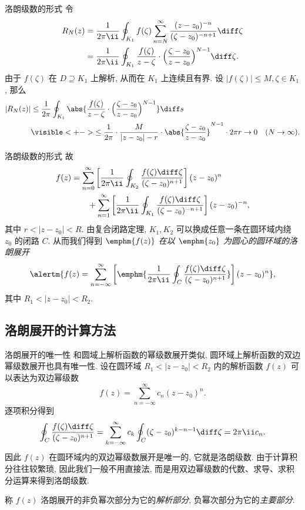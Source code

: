 \begin{frame}{洛朗级数的形式}
	\onslide<+->
	令
	\begin{align*}
		R_N(z)&=\frac1{2\pi\ii}\oint_{K_1}f(\zeta)\sum_{n=N}^\infty\frac{(z-z_0)^{-n}}{(\zeta-z_0)^{-n+1}}\diff\zeta\\
		&=\frac1{2\pi\ii}\oint_{K_1}\frac{f(\zeta)}{z-\zeta}\cdot\Bigl(\frac{\zeta-z_0}{z-z_0}\Bigr)^{N-1}\diff\zeta.
	\end{align*}
	\onslide<+->
	由于 $f(\zeta)$ 在 $D\supseteq K_1$ 上解析, 从而在 $K_1$ 上连续且有界.
	\onslide<+->
	设 $|f(\zeta)|\le M,\zeta\in K_1$,
	\onslide<+->
	那么
	\begin{align*}
	|R_N(z)|&\le\frac 1{2\pi}\oint_{K_1}\abs{\frac{f(\zeta)}{z-\zeta}\cdot\Bigl(\frac{\zeta-z_0}{z-z_0}\Bigr)^{N-1}}\diff s\\
	&\visible<+->{\le\frac 1{2\pi}\cdot\frac M{|z-z_0|-r}\cdot\abs{\frac{\zeta-z_0}{z-z_0}}^{N-1}\cdot 2\pi r\to 0\quad (N\to\infty).}
	\end{align*}
\end{frame}


\begin{frame}{洛朗级数的形式}
	\onslide<+->
	故
	\begin{align*}
	f(z)&=\sum_{n=0}^\infty\left[\frac1{2\pi\ii}\oint_{K_2}\frac{f(\zeta)\diff\zeta}{(\zeta-z_0)^{n+1}}\right](z-z_0)^n\\
	&\qquad+\sum_{n=1}^\infty \left[\frac1{2\pi\ii}\oint_{K_1}\frac{f(\zeta)\diff\zeta}{(\zeta-z_0)^{-n+1}}\right](z-z_0)^{-n},
	\end{align*}
	其中 $r<|z-z_0|<R$.
	\onslide<+->
	由复合闭路定理, $K_1,K_2$ 可以换成任意一条在圆环域内绕 $z_0$ 的闭路 $C$.
	\onslide<+->
	从而我们得到 \emph{$\emphm{f(z)}$ 在以 $\emphm{z_0}$ 为圆心的圆环域的洛朗展开}
	\[\alertm{f(z)=\sum_{n=-\infty}^\infty\left[\emphm{\frac1{2\pi\ii}\oint_C\frac{f(\zeta)\diff\zeta}{(\zeta-z_0)^{n+1}}}\right](z-z_0)^n},
	\]
	其中 $R_1<|z-z_0|<R_2$.
\end{frame}


\subsection{洛朗展开的计算方法}

\begin{frame}{洛朗展开的唯一性}
	\onslide<+->
	和圆域上解析函数的幂级数展开类似, 圆环域上解析函数的双边幂级数展开也具有唯一性.
	\onslide<+->
	设在圆环域 $R_1<|z-z_0|<R_2$ 内的解析函数 $f(z)$ 可以表达为双边幂级数
	\[f(z)=\sum_{n=-\infty}^\infty c_n(z-z_0)^n.
	\]
	\onslide<+->
	逐项积分得到
	\[\oint_C\frac{f(\zeta)\diff\zeta}{(\zeta-z_0)^{n+1}}=\sum_{k=-\infty}^\infty c_k\oint_C(\zeta-z_0)^{k-n-1}\diff\zeta=2\pi\ii c_n.
	\]
	\onslide<+->
	因此 $f(z)$ 在圆环域内的\alert{双边幂级数展开是唯一的, 它就是洛朗级数}.
	\onslide<+->
	由于计算积分往往较繁琐, 因此我们一般不用直接法, 而是\alert{用双边幂级数的代数、求导、求积分运算}来得到洛朗级数.
	
	\onslide<+->
	称 $f(z)$ 洛朗展开的非负幂次部分为它的\emph{解析部分}, 负幂次部分为它的\emph{主要部分}.
\end{frame}


